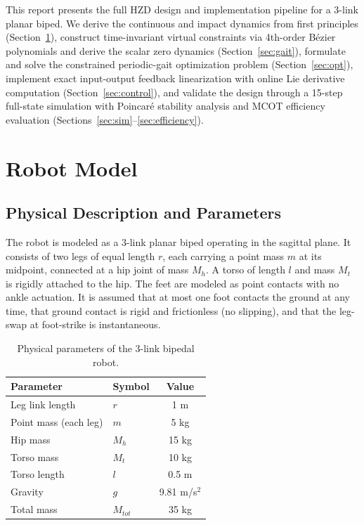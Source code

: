 \documentclass[conference]{IEEEtran}
\begin{document}
This report presents the full HZD design and implementation pipeline for a 3-link planar biped. We derive the continuous and impact dynamics from first principles (Section~\ref{sec:model}), construct time-invariant virtual constraints via 4th-order B\'ezier polynomials and derive the scalar zero dynamics (Section~\ref{sec:gait}), formulate and solve the constrained periodic-gait optimization problem (Section~\ref{sec:opt}), implement exact input-output feedback linearization with online Lie derivative computation (Section~\ref{sec:control}), and validate the design through a 15-step full-state simulation with Poincar\'e stability analysis and MCOT efficiency evaluation (Sections~\ref{sec:sim}--\ref{sec:efficiency}).

\section{Robot Model} \label{sec:model}

\subsection{Physical Description and Parameters}

The robot is modeled as a 3-link planar biped operating in the sagittal plane. It consists of two legs of equal length $r$, each carrying a point mass $m$ at its midpoint, connected at a hip joint of mass $M_h$. A torso of length $l$ and mass $M_t$ is rigidly attached to the hip. The feet are modeled as point contacts with no ankle actuation. It is assumed that at most one foot contacts the ground at any time, that ground contact is rigid and frictionless (no slipping), and that the leg-swap at foot-strike is instantaneous.

\begin{table}[htbp]
    \centering
    \caption{Physical parameters of the 3-link bipedal robot.}
    \label{tab:params}
    \begin{tabular}{llc}
        \toprule
        \textbf{Parameter} & \textbf{Symbol} & \textbf{Value} \\
        \midrule
        Leg link length      & $r$       & 1 m \\
        Point mass (each leg)& $m$       & 5 kg \\
        Hip mass             & $M_h$     & 15 kg \\
        Torso mass           & $M_t$     & 10 kg \\
        Torso length         & $l$       & 0.5 m \\
        Gravity              & $g$       & 9.81 m/s$^2$ \\
        Total mass           & $M_{tot}$ & 35 kg \\
        \bottomrule
    \end{tabular}
\end{table}
\end{document}
